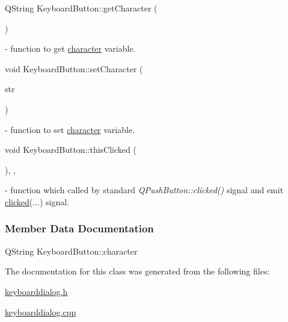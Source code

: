 \mbox{\label{classKeyboardButton_a44c7448a3bae4dbc1a3f4f7ecbaeafbd}} 
{\footnotesize\ttfamily Q\+String Keyboard\+Button\+::\texorpdfstring{get\+Character}{getCharacter} (\begin{DoxyParamCaption}{ }\end{DoxyParamCaption})} - function to get \hyperlink{classKeyboardButton_a8979a4765bd83241a9a253211ec03774}{character} variable.

\mbox{\label{classKeyboardButton_aca3123dc3392dc90f631bf8004a71061}} 
{\footnotesize\ttfamily void Keyboard\+Button\+::\texorpdfstring{set\+Character}{setCharacter} (\begin{DoxyParamCaption}\item[{Q\+String}]{str }\end{DoxyParamCaption})} - function to set \hyperlink{classKeyboardButton_a8979a4765bd83241a9a253211ec03774}{character} variable.

\mbox{\label{classKeyboardButton_a518fc800cf7acf3b2a9614c7bfe74f93}} 
{\footnotesize\ttfamily void Keyboard\+Button\+::\texorpdfstring{this\+Clicked}{thisClicked} (\begin{DoxyParamCaption}{ }\end{DoxyParamCaption}){\ttfamily [inline]}, {\ttfamily [private]}, {\ttfamily [slot]}} - function which called by standard \textit{Q\+Push\+Button::clicked()} signal and emit \hyperlink{classKeyboardButton_a6c6694c8330565de78f47f3c5fe11d06}{clicked}(...) signal.



\subsubsection{Member Data Documentation}
\mbox{\label{classKeyboardButton_a8979a4765bd83241a9a253211ec03774}} 
{\footnotesize\ttfamily Q\+String Keyboard\+Button\+::\texorpdfstring{character}{character}{\ttfamily [private]}}



The documentation for this class was generated from the following files\+:\begin{DoxyCompactItemize}
\item 
\mbox{\hyperlink{keyboarddialog_8h}{keyboarddialog.\+h}}\item 
\mbox{\hyperlink{keyboarddialog_8cpp}{keyboarddialog.\+cpp}}\end{DoxyCompactItemize}
\newpage